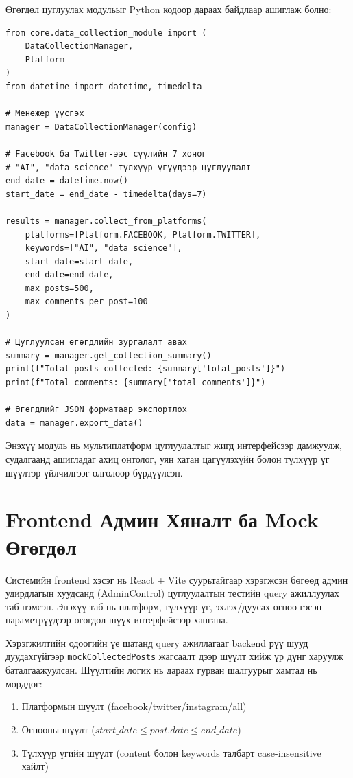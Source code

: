\documentclass[12pt,a4paper]{report}
\begin{document}
Өгөгдөл цуглуулах модульыг Python кодоор дараах байдлаар ашиглаж болно:

\begin{verbatim}
from core.data_collection_module import (
    DataCollectionManager,
    Platform
)
from datetime import datetime, timedelta

# Менежер үүсгэх
manager = DataCollectionManager(config)

# Facebook ба Twitter-ээс сүүлийн 7 хоног
# "AI", "data science" түлхүүр үгүүдээр цуглуулалт
end_date = datetime.now()
start_date = end_date - timedelta(days=7)

results = manager.collect_from_platforms(
    platforms=[Platform.FACEBOOK, Platform.TWITTER],
    keywords=["AI", "data science"],
    start_date=start_date,
    end_date=end_date,
    max_posts=500,
    max_comments_per_post=100
)

# Цуглуулсан өгөгдлийн зургалалт авах
summary = manager.get_collection_summary()
print(f"Total posts collected: {summary['total_posts']}")
print(f"Total comments: {summary['total_comments']}")

# Өгөгдлийг JSON форматаар экспортлох
data = manager.export_data()
\end{verbatim}

Энэхүү модуль нь мультиплатформ цуглуулалтыг жигд интерфейсээр дамжуулж, судалгаанд ашигладаг ахиц онтолог, уян хатан цагүүлэхүйн болон түлхүүр үг шүүлтэр үйлчилгээг олголоор бүрдүүлсэн.

\section{Frontend Админ Хяналт ба Mock Өгөгдөл}

Системийн frontend хэсэг нь React + Vite суурьтайгаар хэрэгжсэн бөгөөд админ удирдлагын хуудсанд (AdminControl) цуглуулалтын тестийн query ажиллуулах таб нэмсэн. Энэхүү таб нь платформ, түлхүүр үг, эхлэх/дуусах огноо гэсэн параметрүүдээр өгөгдөл шүүх интерфейсээр хангана.

Хэрэгжилтийн одоогийн үе шатанд query ажиллагааг backend рүү шууд дуудахгүйгээр \texttt{mockCollectedPosts} жагсаалт дээр шүүлт хийж үр дүнг харуулж баталгаажуулсан. Шүүлтийн логик нь дараах гурван шалгуурыг хамтад нь мөрддөг:

\begin{enumerate}
    \item Платформын шүүлт (facebook/twitter/instagram/all)
    \item Огнооны шүүлт ($start\_date \leq post.date \leq end\_date$)
    \item Түлхүүр үгийн шүүлт (content болон keywords талбарт case-insensitive хайлт)
\end{enumerate}
\end{document}
